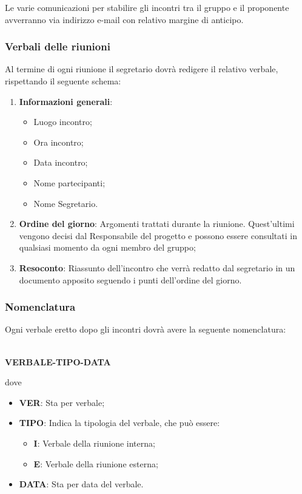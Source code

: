 Le varie comunicazioni per stabilire gli incontri tra il gruppo e il proponente avverranno via indirizzo e-mail con relativo margine di anticipo.
\subsubsection{Verbali delle riunioni}
Al termine di ogni riunione il segretario dovrà redigere il relativo verbale, rispettando il seguente
schema:
\begin{enumerate}
	\item \textbf{Informazioni generali}:
		\begin{itemize}
			\item Luogo incontro;
			\item Ora incontro;
			\item Data incontro;
			\item Nome partecipanti;
			\item Nome Segretario.
		\end{itemize}
	\item \textbf{Ordine del giorno}: Argomenti trattati durante la riunione. Quest’ultimi vengono decisi dal Responsabile del progetto e possono essere consultati in qualsiasi momento da ogni membro del gruppo;
	\item \textbf{Resoconto}: Riassunto dell’incontro che verrà redatto dal segretario in un documento apposito seguendo i punti dell’ordine del giorno.
\end{enumerate}
\subsubsection{Nomenclatura}
Ogni verbale eretto dopo gli incontri dovrà avere la seguente nomenclatura:\\ \\
\centerline {\textbf{VERBALE-TIPO-DATA}}
dove \\
\begin{itemize}
\item \textbf{VER}: Sta per verbale;
\item \textbf{TIPO}: Indica la tipologia del verbale, che può essere:
	\begin{itemize}
  		\item \textbf{I}: Verbale della riunione interna;
 		 \item \textbf{E}: Verbale della riunione esterna;
	\end{itemize}
\item \textbf{DATA}: Sta per data del verbale.
\end{itemize}

